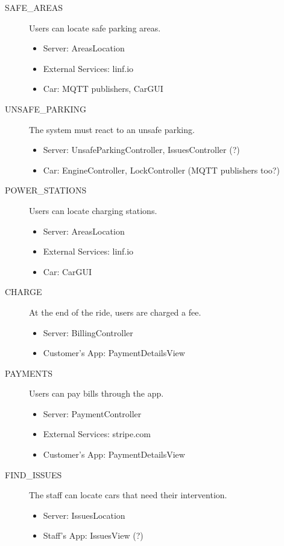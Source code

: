 \documentclass[11pt]{article} %
\begin{document}
\begin{description}
	\item[SAFE\_AREAS] Users can locate safe parking areas.
	\begin{itemize}
		\item Server: AreasLocation
		\item External Services: linf.io
		\item Car: MQTT publishers, CarGUI
	\end{itemize}

	\item[UNSAFE\_PARKING] The system must react to an unsafe parking.
	\begin{itemize}
		\item Server: UnsafeParkingController, IssuesController (?)
		\item Car: EngineController, LockController (MQTT publishers too?)
	\end{itemize}

	\item[POWER\_STATIONS] Users can locate charging stations.
	\begin{itemize}
		\item Server: AreasLocation
		\item External Services: linf.io
		\item Car: CarGUI
	\end{itemize}

	\item[CHARGE] At the end of the ride, users are charged a fee.
	\begin{itemize}
		\item Server: BillingController
		\item Customer's App: PaymentDetailsView
	\end{itemize}

	\item[PAYMENTS] Users can pay bills through the app.
	\begin{itemize}
		\item Server: PaymentController
		\item External Services: stripe.com
		\item Customer's App: PaymentDetailsView
	\end{itemize}

	\item[FIND\_ISSUES] The staff can locate cars that need their intervention.
	\begin{itemize}
		\item Server: IssuesLocation
		\item Staff's App: IssuesView (?)
	\end{itemize}


\end{description}
\end{document}
